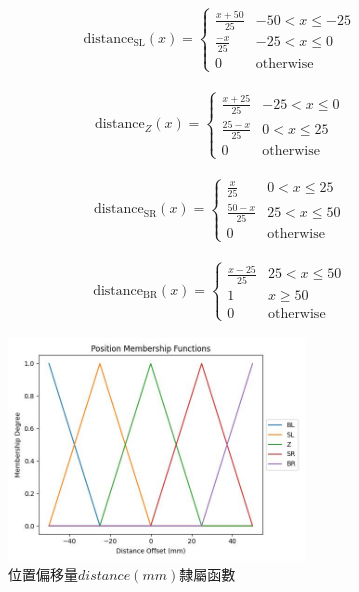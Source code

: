 \documentclass[12pt]{article}       %
\begin{document}
\begin{align}
    \text{distance}_{\text{SL}}(x) = 
    \begin{cases}
    \frac{x + 50}{25} & -50 < x \le -25 \\
    \frac{-x}{25} & -25 < x \le 0 \\
    0 & \text{otherwise}
    \end{cases}    
\end{align}

\begin{align}
    \text{distance}_{Z}(x) = 
    \begin{cases}
    \frac{x + 25}{25} & -25 < x \le 0 \\
    \frac{25 - x}{25} & 0 < x \le 25 \\
    0 & \text{otherwise}
    \end{cases}    
\end{align}

\begin{align}
    \text{distance}_{\text{SR}}(x) = 
    \begin{cases}
    \frac{x}{25} & 0 < x \le 25 \\
    \frac{50 - x}{25} & 25 < x \le 50 \\
    0 & \text{otherwise}
    \end{cases}    
\end{align}

\begin{align}
    \text{distance}_{\text{BR}}(x) = 
    \begin{cases}
    \frac{x - 25}{25} & 25 < x \le 50 \\
    1 & x \ge 50 \\
    0 & \text{otherwise}
    \end{cases}    
\end{align}

\begin{figure}[H]
    \centering
    \includegraphics[width=0.7\textwidth]{21.jpg}     %
    \caption{位置偏移量$distance(mm)$隸屬函數}    %
    \label{fig:21}    %
\end{figure}
\end{document}
